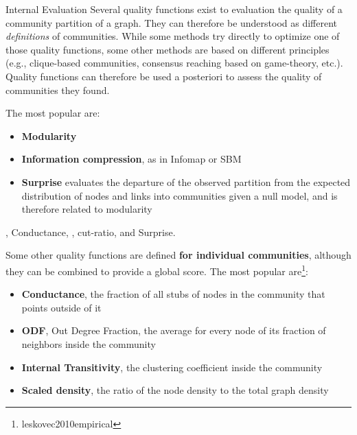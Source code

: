 \begin{textbox}{Internal Evaluation}
Several quality functions exist to evaluation the quality of a community partition of a graph. They can therefore be understood as different \textit{definitions} of communities. While some methods try directly to optimize one of those quality functions, some other methods are based on different principles (e.g., clique-based communities, consensus reaching based on game-theory, etc.). Quality functions can therefore be used a posteriori to assess the quality of communities they found. 

The most popular are:
\begin{itemize}
    \item \textbf{Modularity}
    \item \textbf{Information compression}, as in Infomap or SBM
    \item \textbf{Surprise} \cite{aldecoa2013surprise} evaluates the departure of the observed partition from the expected distribution of nodes and links into communities given a null model, and is therefore related to modularity 
\end{itemize}, Conductance, , cut-ratio, and Surprise.

Some other quality functions are defined \textbf{for individual communities}, although they can be combined to provide a global score. The most popular are\footnote{leskovec2010empirical}:
\begin{itemize}
    \item \textbf{Conductance}, the fraction of all stubs of nodes in the community that points outside of it
    \item \textbf{ODF}, Out Degree Fraction, the average for every node of its fraction of neighbors inside the community
    \item \textbf{Internal Transitivity}, the clustering coefficient inside the community
    \item \textbf{Scaled density}, the ratio of the node density to the total graph density
\end{itemize}


\end{textbox}

